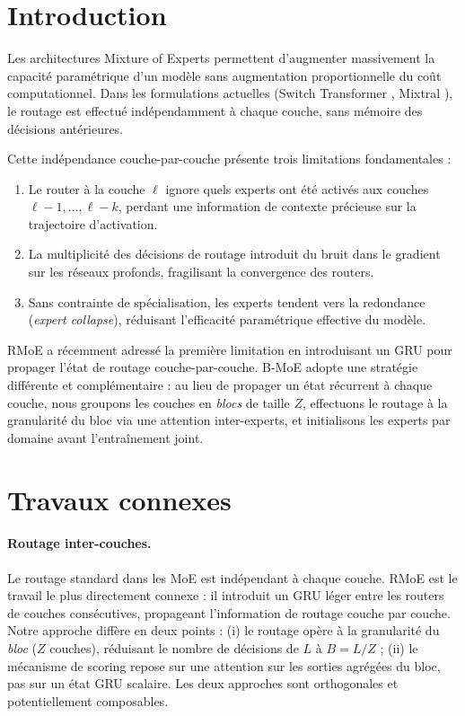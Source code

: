 \documentclass[10pt,a4paper]{article}
\begin{document}
\section{Introduction}

Les architectures Mixture of Experts \cite{shazeer2017outrageously} permettent d'augmenter massivement la capacité paramétrique d'un modèle sans augmentation proportionnelle du coût computationnel. Dans les formulations actuelles (Switch Transformer \cite{fedus2022switch}, Mixtral \cite{jiang2024mixtral}), le routage est effectué indépendamment à chaque couche, sans mémoire des décisions antérieures.

Cette indépendance couche-par-couche présente trois limitations fondamentales :
\begin{enumerate}
  \item Le router à la couche $\ell$ ignore quels experts ont été activés aux couches $\ell-1, \ldots, \ell-k$, perdant une information de contexte précieuse sur la trajectoire d'activation.
  \item La multiplicité des décisions de routage introduit du bruit dans le gradient sur les réseaux profonds, fragilisant la convergence des routers.
  \item Sans contrainte de spécialisation, les experts tendent vers la redondance (\textit{expert collapse}), réduisant l'efficacité paramétrique effective du modèle.
\end{enumerate}

RMoE \cite{qiu2025rmoe} a récemment adressé la première limitation en introduisant un GRU pour propager l'état de routage couche-par-couche. B-MoE adopte une stratégie différente et complémentaire : au lieu de propager un état récurrent à chaque couche, nous groupons les couches en \textit{blocs} de taille $Z$, effectuons le routage à la granularité du bloc via une attention inter-experts, et initialisons les experts par domaine avant l'entraînement joint.

\section{Travaux connexes}

\paragraph{Routage inter-couches.}
Le routage standard dans les MoE \cite{shazeer2017outrageously,fedus2022switch} est indépendant à chaque couche. RMoE \cite{qiu2025rmoe} est le travail le plus directement connexe : il introduit un GRU léger entre les routers de couches consécutives, propageant l'information de routage couche par couche. Notre approche diffère en deux points : (i) le routage opère à la granularité du \textit{bloc} ($Z$ couches), réduisant le nombre de décisions de $L$ à $B = L/Z$ ; (ii) le mécanisme de scoring repose sur une attention sur les sorties agrégées du bloc, pas sur un état GRU scalaire. Les deux approches sont orthogonales et potentiellement composables.
\end{document}
